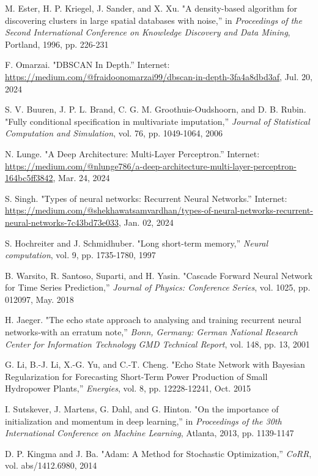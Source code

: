 \begin{thebibliography}{99}
M. Ester, H. P. Kriegel, J. Sander, and X. Xu. "A density-based algorithm for discovering clusters in large spatial databases with noise,'' in \textit{Proceedings of the Second International Conference on Knowledge Discovery and Data Mining}, Portland, 1996, pp. 226-231

F. Omarzai. "DBSCAN In Depth.'' Internet: \url{https://medium.com/@fraidoonomarzai99/dbscan-in-depth-3fa4a8dbd3af}, Jul. 20, 2024

S. V. Buuren, J. P. L. Brand, C. G. M. Groothuis-Oudshoorn, and D. B. Rubin. "Fully conditional specification in multivariate imputation,'' \textit{Journal of Statistical Computation and Simulation}, vol. 76, pp. 1049-1064, 2006

N. Lunge. "A Deep Architecture: Multi-Layer Perceptron.'' Internet: \url{https://medium.com/@nlunge786/a-deep-architecture-multi-layer-perceptron-164bc5ff3842}, Mar. 24, 2024

S. Singh. "Types of neural networks: Recurrent Neural Networks.'' Internet: \url{https://medium.com/@shekhawatsamvardhan/types-of-neural-networks-recurrent-neural-networks-7c43bd73e033}, Jan. 02, 2024

S. Hochreiter and J. Schmidhuber. "Long short-term memory,'' \textit{Neural computation}, vol. 9, pp. 1735-1780, 1997

B. Warsito, R. Santoso, Suparti, and H. Yasin. "Cascade Forward Neural Network for Time Series Prediction,'' \textit{Journal of Physics: Conference Series}, vol. 1025, pp. 012097, May. 2018

H. Jaeger. "The echo state approach to analysing and training recurrent neural networks-with an erratum note,'' \textit{Bonn, Germany: German National Research Center for Information Technology GMD Technical Report}, vol. 148, pp. 13, 2001

G. Li, B.-J. Li, X.-G. Yu, and C.-T. Cheng. "Echo State Network with Bayesian Regularization for Forecasting Short-Term Power Production of Small Hydropower Plants,'' \textit{Energies}, vol. 8, pp. 12228-12241, Oct. 2015

I. Sutskever, J. Martens, G. Dahl, and G. Hinton. "On the importance of initialization and momentum in deep learning,'' in \textit{Proceedings of the 30th International Conference on Machine Learning}, Atlanta, 2013, pp. 1139-1147

D. P. Kingma and J. Ba. "Adam: A Method for Stochastic Optimization,'' \textit{CoRR}, vol. abs/1412.6980, 2014

\end{thebibliography}

% 
% 
% 
